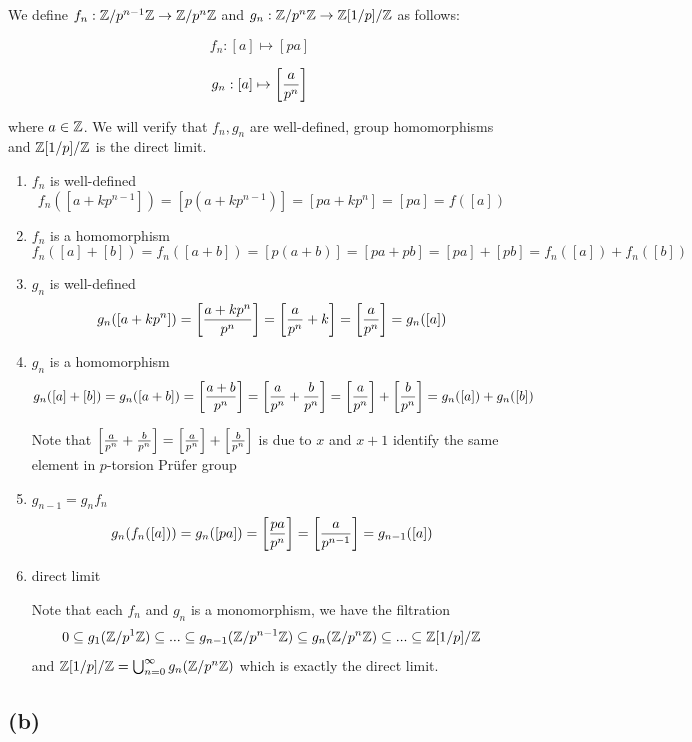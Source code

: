 \documentclass{article}
\begin{document}
We define $f_n: \Z / p^{n-1} \Z \to \Z / p^n \Z$ and $g_n: \Z / p^n \Z \to \Z[1/p]/\Z$ as follows:

$$
    f_n: [a] \mapsto [pa]
$$

$$
    g_n: [a] \mapsto \bracket*{\frac{a}{p^n}}
$$

where $a \in \Z$. We will verify that $f_n, g_n$ are well-defined, group homomorphisms and $\Z[1/p]/\Z$ is the direct limit.

\begin{enumerate}
    \item $f_n$ is well-defined
    $$
        f_n([a + k p^{n-1}]) = [p(a + k p^{n-1})] = [pa + k p^n] = [pa] = f([a])
    $$

    \item $f_n$ is a homomorphism
    $$
        f_n([a] + [b]) = f_n([a + b]) = [p(a + b)] = [pa + pb] = [pa] + [pb] = f_n([a]) + f_n([b])
    $$

    \item $g_n$ is well-defined
    $$
        g_n([a + k p^n]) = \bracket*{\frac{a + k p^n}{p^n}} = \bracket*{\frac{a}{p^n} + k} = \bracket*{\frac{a}{p^n}} = g_n([a])
    $$

    \item $g_n$ is a homomorphism
    $$
        g_n([a] + [b]) = g_n([a + b]) = \bracket*{\frac{a + b}{p^n}} = \bracket*{\frac{a}{p^n} + \frac{b}{p^n}} = \bracket*{\frac{a}{p^n}} + \bracket*{\frac{b}{p^n}} = g_n([a]) + g_n([b])
    $$

    Note that $\bracket*{\frac{a}{p^n} + \frac{b}{p^n}} = \bracket*{\frac{a}{p^n}} + \bracket*{\frac{b}{p^n}}$ is due to $x$ and $x + 1$ identify the same element in $p$-torsion Prüfer group

    \item $g_{n-1} = g_n f_n$
    $$
        g_n(f_n([a])) = g_n([pa]) = \bracket*{\frac{pa}{p^n}} = \bracket*{\frac{a}{p^{n-1}}} = g_{n-1}([a])
    $$

    \item direct limit

    Note that each $f_n$ and $g_n$ is a monomorphism, we have the filtration
    $$
        0 \subseteq g_1(\Z / p^1 \Z) \subseteq ... \subseteq g_{n-1}(\Z / p^{n-1} \Z) \subseteq g_n(\Z / p^n \Z) \subseteq ... \subseteq \Z[1/p]/\Z
    $$
    and $\Z[1/p]/\Z = \bigcup_{n=0}^\infty g_n(\Z / p^n \Z)$ which is exactly the direct limit.
\end{enumerate}

\subsection{(b)}
\end{document}
